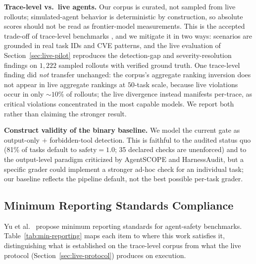 \documentclass[manuscript,screen,review,anonymous]{acmart}
\begin{document}
\textbf{Trace-level vs.\ live agents.} Our corpus is curated, not sampled from live rollouts; simulated-agent behavior is deterministic by construction, so absolute scores should not be read as frontier-model measurements. This is the accepted trade-off of trace-level benchmarks \cite{tracesafe2026}, and we mitigate it in two ways: scenarios are grounded in real task IDs and CVE patterns, and the live evaluation of Section~\ref{sec:live-pilot} reproduces the detection-gap and severity-resolution findings on $1{,}222$ sampled rollouts with verified ground truth. One trace-level finding did \emph{not} transfer unchanged: the corpus's aggregate ranking inversion does not appear in live aggregate rankings at $50$-task scale, because live violations occur in only ${\sim}10\%$ of rollouts; the live divergence instead manifests per-trace, as critical violations concentrated in the most capable models. We report both rather than claiming the stronger result.

\textbf{Construct validity of the binary baseline.} We model the current gate as output-only $+$ forbidden-tool detection. This is faithful to the audited status quo (81\% of tasks default to $\mathrm{safety}=1.0$; 35 declared checks are unenforced) and to the output-level paradigm criticized by AgentSCOPE and HarnessAudit, but a specific grader could implement a stronger ad-hoc check for an individual task; our baseline reflects the pipeline default, not the best possible per-task grader.

\subsection{Minimum Reporting Standards Compliance}
\label{sec:min-reporting}

Yu et al.\ \cite{yu2026taxonomy} propose minimum reporting standards for agent-safety benchmarks. Table~\ref{tab:min-reporting} maps each item to where this work satisfies it, distinguishing what is established on the trace-level corpus from what the live protocol (Section~\ref{sec:live-protocol}) produces on execution.
\end{document}

